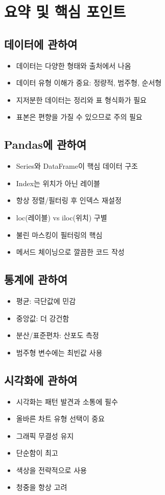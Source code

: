 \documentclass[12pt,a4paper]{article}
\begin{document}
\section{요약 및 핵심 포인트}

\subsection{데이터에 관하여}
\begin{itemize}
    \item 데이터는 다양한 형태와 출처에서 나옴
    \item 데이터 유형 이해가 중요: 정량적, 범주형, 순서형
    \item 지저분한 데이터는 정리와 표 형식화가 필요
    \item 표본은 편향을 가질 수 있으므로 주의 필요
\end{itemize}

\subsection{Pandas에 관하여}
\begin{itemize}
    \item Series와 DataFrame이 핵심 데이터 구조
    \item Index는 위치가 아닌 레이블
    \item 항상 정렬/필터링 후 인덱스 재설정
    \item loc(레이블) vs iloc(위치) 구별
    \item 불린 마스킹이 필터링의 핵심
    \item 메서드 체이닝으로 깔끔한 코드 작성
\end{itemize}

\subsection{통계에 관하여}
\begin{itemize}
    \item 평균: 극단값에 민감
    \item 중앙값: 더 강건함
    \item 분산/표준편차: 산포도 측정
    \item 범주형 변수에는 최빈값 사용
\end{itemize}

\subsection{시각화에 관하여}
\begin{itemize}
    \item 시각화는 패턴 발견과 소통에 필수
    \item 올바른 차트 유형 선택이 중요
    \item 그래픽 무결성 유지
    \item 단순함이 최고
    \item 색상을 전략적으로 사용
    \item 청중을 항상 고려
\end{itemize}
\end{document}

